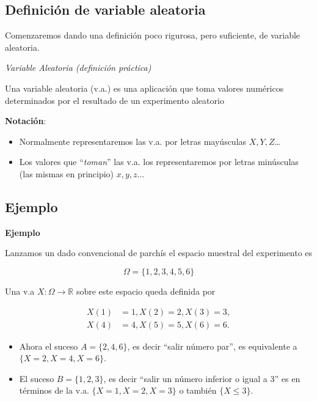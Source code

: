 \documentclass[]{book}
\providecommand{\tightlist}{%
  \setlength{\itemsep}{0pt}\setlength{\parskip}{0pt}}
\begin{document}
\hypertarget{definiciuxf3n-de-variable-aleatoria}{%
\subsection{Definición de variable aleatoria}\label{definiciuxf3n-de-variable-aleatoria}}

Comenzaremos dando una definición poco rigurosa, pero suficiente, de variable aleatoria.

 \emph{Variable Aleatoria (definición práctica)}

Una variable aleatoria (v.a.) es una aplicación que toma valores numéricos determinados por el resultado de un experimento aleatorio

\textbf{Notación}:

\begin{itemize}
\tightlist
\item
  Normalmente representaremos las v.a. por letras mayúsculas \(X,Y,Z\)\ldots
\item
  Los valores que ``\emph{toman}'' las v.a. los representaremos por letras minúsculas (las mismas en principio) \(x,y,z\ldots\)
\end{itemize}

\hypertarget{ejemplo-2}{%
\subsection{Ejemplo}\label{ejemplo-2}}

\textbf{Ejemplo}

Lanzamos un dado convencional de parchís el espacio muestral del experimento es

\[\Omega=\{1,2, 3, 4,  5, 6\}\]

Una v.a \(X:\Omega\to\mathbb{R}\)
sobre este espacio queda definida por

\begin{equation*}
\begin{split}
X(1)&=1,X(2)=2,X(3)=3,\\
X(4)&=4,X(5)=5,X(6)=6.
\end{split}
\end{equation*}

\begin{itemize}
\tightlist
\item
  Ahora el suceso \(A=\{2, 4, 6\}\), es decir ``salir
  número par'', es equivalente a \(\{X=2,X=4,X=6\}\).
\item
  El suceso \(B=\{1,2,3\}\), es decir ``salir un número
  inferior o igual a \(3\)'' es en términos de la v.a. \(\{X=1,X=2,X=3\}\) o también \(\{X\leq 3\}\).
\end{itemize}
\end{document}
